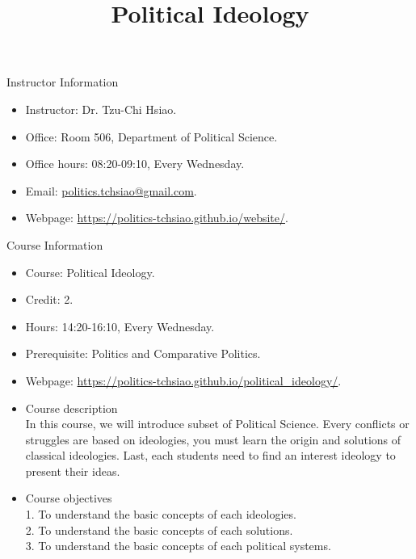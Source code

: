 \documentclass{article}
\title{\fontsize{16pt}{16pt}\selectfont Political Ideology}
\author{}
\date{}
\begin{document}
\maketitle
\fontsize{14pt}{14pt}\selectfont
\begin{flushleft}
Instructor Information
\end{flushleft}
\begin{itemize}
\item Instructor: Dr. Tzu-Chi Hsiao. \\
\item Office: Room 506, Department of Political Science. \\
\item Office hours: 08:20-09:10, Every Wednesday. \\
\item Email: \href{mailto:politics.tchsiao@gmail.com}{politics.tchsiao@gmail.com}. \\
\item Webpage: \href{https://politics-tchsiao.github.io/website/}{https://politics-tchsiao.github.io/website/}. \\
\end{itemize}
Course Information \\
\begin{itemize}
\item Course: Political Ideology. \\
\item Credit: 2. \\
\item Hours: 14:20-16:10, Every Wednesday. \\
\item Prerequisite: Politics and Comparative Politics. \\
\item Webpage: \href{https://politics-tchsiao.github.io/political\_ideology/}{https://politics-tchsiao.github.io/political\_ideology/}. \\
\item Course description \\
In this course, we will introduce subset of Political Science. Every conflicts or struggles are based on ideologies, you must learn the origin and solutions of classical ideologies. Last, each students need to find an interest ideology to present their ideas. \\ 
\item Course objectives \\
1. To understand the basic concepts of each ideologies. \\
2. To understand the basic concepts of each solutions. \\
3. To understand the basic concepts of each political systems. \\
\end{itemize}
\end{document}
